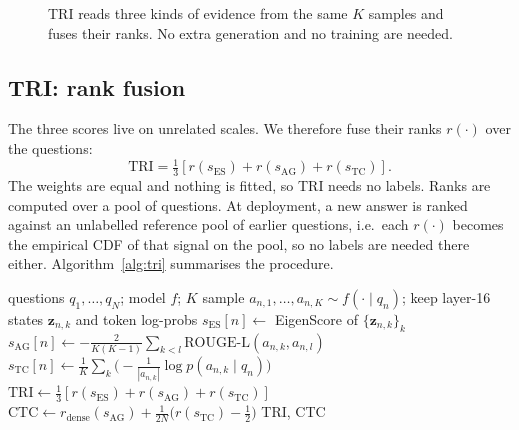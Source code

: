 \documentclass[journal]{IEEEtran}
\begin{document}
\begin{figure}[t]
\centering
{}
\caption{TRI reads three kinds of evidence from the same $K$ samples and fuses their ranks. No extra generation and no training are needed.}
\label{fig:method}
\end{figure}

\subsection{TRI: rank fusion}
The three scores live on unrelated scales. We therefore fuse their ranks $r(\cdot)$ over the questions:
\begin{equation}
\mathrm{TRI}=\tfrac13\left[r(s_{\mathrm{ES}})+r(s_{\mathrm{AG}})+r(s_{\mathrm{TC}})\right].
\end{equation}
The weights are equal and nothing is fitted, so TRI needs no labels. Ranks are computed over a pool of questions. At deployment, a new answer is ranked against an unlabelled reference pool of earlier questions, i.e.\ each $r(\cdot)$ becomes the empirical CDF of that signal on the pool, so no labels are needed there either. Algorithm~\ref{alg:tri} summarises the procedure.

\begin{algorithm}[t]
\caption{TRI and CTC scoring}
\label{alg:tri}
\footnotesize
\begin{algorithmic}[1]
\Require questions $q_1,\dots,q_N$; model $f$; $K$
  \State sample $a_{n,1},\dots,a_{n,K}\sim f(\cdot\mid q_n)$; keep layer-16 states $\mathbf{z}_{n,k}$ and token log-probs
  \State $s_{\mathrm{ES}}[n]\gets$ EigenScore of $\{\mathbf{z}_{n,k}\}_k$ 
  \State $s_{\mathrm{AG}}[n]\gets -\frac{2}{K(K-1)}\sum_{k<l}\mathrm{ROUGE\text{-}L}(a_{n,k},a_{n,l})$
  \State $s_{\mathrm{TC}}[n]\gets \frac1K\sum_k \big(-\frac{1}{|a_{n,k}|}\log p(a_{n,k}\mid q_n)\big)$
\EndFor
\State $\mathrm{TRI}\gets\frac13[r(s_{\mathrm{ES}})+r(s_{\mathrm{AG}})+r(s_{\mathrm{TC}})]$
\State $\mathrm{CTC}\gets r_{\text{dense}}(s_{\mathrm{AG}})+\frac{1}{2N}\big(r(s_{\mathrm{TC}})-\tfrac12\big)$
\State \Return TRI, CTC 
\end{algorithmic}
\end{algorithm}
\end{document}
